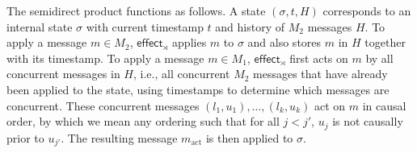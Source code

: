 \documentclass[acmsmall,nonacm]{acmart}
\newcommand{\msf}[1]{\ensuremath{\mathsf{#1}}}
\theoremstyle{plain}
\theoremstyle{definition}
\begin{document}
The semidirect product functions as follows.  A state $(\sigma, t,  H)$ corresponds to an internal state $\sigma$ with current timestamp $t$ and history of $M_2$ messages $H$.  To apply a message $m \in M_2$, $\msf{effect}_\rtimes$ applies $m$ to $\sigma$ and also stores $m$ in $H$ together with its timestamp.  To apply a message $m \in M_1$, $\msf{effect}_\rtimes$ first acts on $m$ by all concurrent messages in $H$, i.e., all concurrent $M_2$ messages that have already been applied to the state, using timestamps to determine which messages are concurrent.  These concurrent messages $(l_1, u_1), \dots, (l_k, u_k)$ act on $m$ in causal order, by which we mean any ordering such that for all $j < j'$, $u_j$ is not causally prior to $u_{j'}$.  The resulting message $m_{\text{act}}$ is then applied to $\sigma$.
\end{document}
